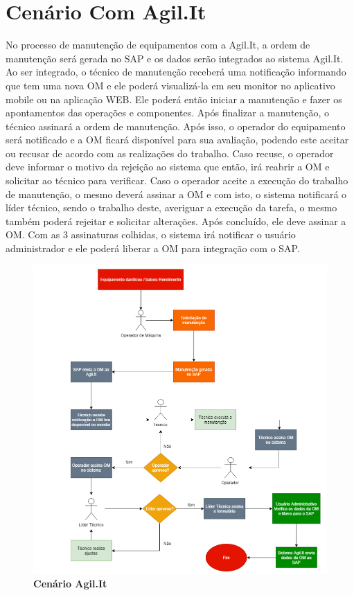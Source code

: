 {\section{Cenário Com Agil.It}
No processo de manutenção de equipamentos com a Agil.It, a ordem de manutenção será gerada no SAP e os dados serão integrados ao sistema Agil.It. Ao ser integrado, o técnico de manutenção receberá uma notificação informando que tem uma nova OM e ele poderá visualizá-la em seu monitor no aplicativo mobile ou na aplicação WEB. Ele poderá então iniciar a manutenção e fazer os apontamentos das operações e componentes. Após finalizar a manutenção, o técnico assinará a ordem de manutenção. Após isso, o operador do equipamento será notificado e a OM ficará disponível para sua avaliação, podendo este aceitar ou recusar de acordo com as realizações do trabalho. Caso recuse, o operador deve informar o motivo da rejeição ao sistema que então, irá reabrir a OM e solicitar ao técnico para verificar. Caso o operador aceite a execução do trabalho de manutenção, o mesmo deverá assinar a OM e com isto, o sistema notificará o líder técnico, sendo o trabalho deste, averiguar a execução da tarefa, o mesmo também poderá rejeitar e solicitar alterações. Após concluído, ele deve assinar a OM. Com as 3 assinaturas colhidas, o sistema irá notificar o usuário administrador e ele poderá liberar a OM para integração com o SAP.
\newpage
\begin{figure}[htb]
	\caption{\textbf{\label{figure:cenario_agilit1}Cenário Agil.It}}
	\begin{center}
		\includegraphics[scale=0.52]{./Figuras/cenario-agilit1.png}
	\end{center}
\end{figure}
}
